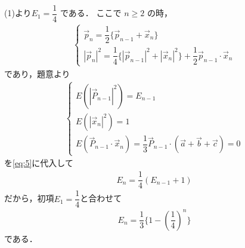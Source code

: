 \documentclass[../../main.tex]{subfiles}
\begin{document}
(1)より$E_1 = \dfrac{1}{4}$ である．
ここで $n \ge 2$ の時，
\begin{align}
  \begin{cases}
    \vec{p}_n = \dfrac{1}{2} \{ \vec{p}_{n-1} + \vec{x}_n \} \\
    |\vec{p}_n|^2 = \dfrac{1}{4}\{ |\vec{p}_{n-1}|^2 + |\vec{x}_n|^2 \} + \dfrac{1}{2}\vec{p}_{n-1} \cdot \vec{x}_n
  \end{cases}\label{eq:5}
\end{align}
であり，題意より
\begin{align}
  \begin{cases}
    E(|\vec{P}_{n-1}|^2) = E_{n-1} \\
    E(|\vec{x}_n|^2) = 1 \\
    E(\vec{P}_{n-1} \cdot \vec{x}_n) = \dfrac{1}{3}\vec{P}_{n-1} \cdot (\vec{a} + \vec{b} + \vec{c}) = 0
  \end{cases}
\end{align}
を\cref{eq:5}に代入して
\begin{align}
  E_n = \dfrac{1}{4} (E_{n-1} + 1)
\end{align}
だから，初項$E_1=\dfrac{1}{4}$と合わせて
\begin{align}
  E_n = \dfrac{1}{3}\{1 - \left(\dfrac{1}{4}\right)^n\}
\end{align}
である．
\end{document}
